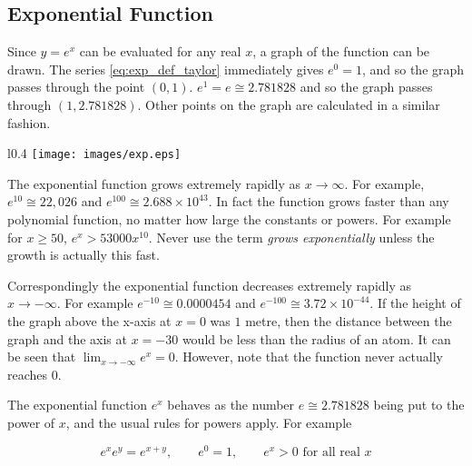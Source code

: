 \documentclass[11pt,a4paper,titlepage,oneside,openany]{article}
\begin{document}
\subsection*{Exponential Function}

Since $y=e^x$ can be evaluated for any real $x$, a graph of the function can be drawn. The series \eqref{eq:exp_def_taylor} immediately gives $e^0=1$, and so the graph passes through the point $(0,1)$. $e^1=e \cong 2.781828$ and so the graph passes through $(1,2.781828)$. Other points on the graph are calculated in a similar fashion.

\begin{wrapfigure}{l}{0.4\textwidth}
    \texttt{[image: images/exp.eps]}
\end{wrapfigure}
The exponential function grows extremely rapidly as $x \to \infty$. For example, $e^{10}\cong 22,026$ and $e^{100}\cong 2.688 \times 10^{43}$. In fact the function grows faster than any polynomial function, no matter how large the constants or powers. For example for $x\ge50$, $e^x> 53000 x^{10}$. Never use the term \emph{grows exponentially} unless the growth is actually this fast.

Correspondingly the exponential function decreases extremely rapidly as $x \to -\infty$. For example $e^{-10} \cong 0.0000454$ and $e^{-100}\cong 3.72 \times 10^{-44}$. If the height of the graph above the x-axis at $x=0$ was $1$ metre, then the distance between the graph and the axis at $x=-30$ would be less than the radius of an atom. It can be seen that $\lim_{x\to -\infty} e^{x} = 0$. However, note that the function never actually reaches $0$.

The exponential function $e^x$ behaves as the number $e \cong 2.781828$ being put to the power of $x$, and the usual rules for powers apply. For example

\begin{equation*}
  e^{x} e^{y} = e^{x+y} , \qquad e^0=1, \qquad e^x > 0 \text{ for all real } x 
\end{equation*}
\end{document}
